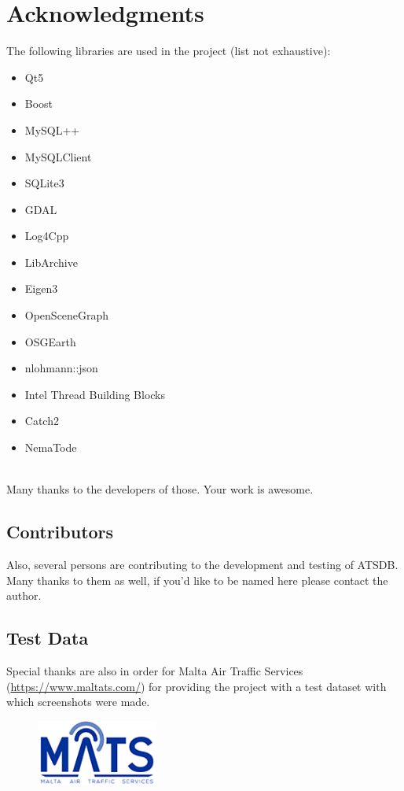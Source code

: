  \section{Acknowledgments}

The following libraries are used in the project (list not exhaustive):

\begin{itemize}  
\item Qt5
\item Boost
\item MySQL++
\item MySQLClient
\item SQLite3
\item GDAL
\item Log4Cpp
\item LibArchive
\item Eigen3
\item OpenSceneGraph
\item OSGEarth
\item nlohmann::json
\item Intel Thread Building Blocks
\item Catch2
\item NemaTode
\end{itemize}
\ \\

Many thanks to the developers of those. Your work is awesome.

\subsection{Contributors}

Also, several persons are contributing to the development and testing of ATSDB. Many thanks to them as well, if you'd like to be named here please contact the author.

\subsection{Test Data}

Special thanks are also in order for Malta Air Traffic Services (\url{https://www.maltats.com/}) for providing the project with a test dataset with which screenshots were made. \\

\begin{figure}[H]
  \center
    \includegraphics[width=4cm]{../logo/mats-logo-with-bg.png}
\end{figure}




